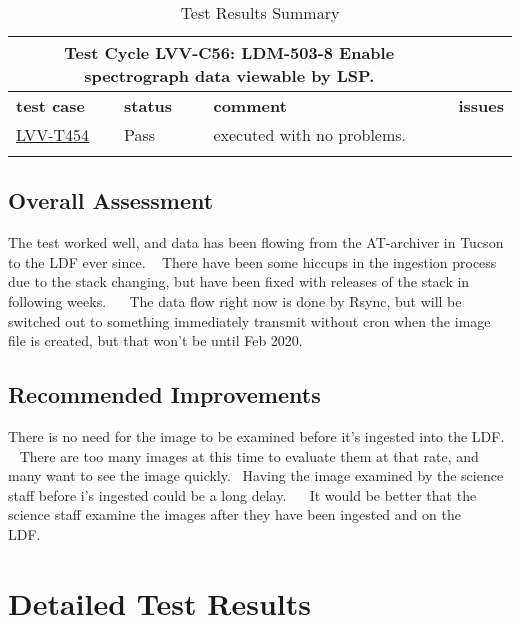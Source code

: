 \documentclass[DM,lsstdraft,STR,toc]{lsstdoc}
\begin{document}
\begin{longtable}{p{}p{}p{}p{}}
\toprule

  \multicolumn{3}{c}{ Test Cycle {\bf LVV-C56: LDM-503-8 Enable spectrograph data viewable by LSP.
 }} \\\hline

  {\bf \footnotesize test case} & {\bf \footnotesize status} & {\bf \footnotesize comment} & {\bf \footnotesize issues} \\\toprule

    \href{https://jira.lsstcorp.org/secure/Tests.jspa#/testCase/LVV-T454}{LVV-T454}
    & Pass & executed with no problems.~
 &
    \\\hline

\caption{Test Results Summary}
\label{table:summary}
\end{longtable}

\subsection{Overall Assessment}
\label{sect:overallassessment}

The test worked well, and data has been flowing from the AT-archiver in
Tucson to the LDF ever since. ~ There have been some hiccups in the
ingestion process due to the stack changing, but have been fixed with
releases of the stack in following weeks. ~ ~The data flow right now is
done by Rsync, but will be switched out to something immediately
transmit without cron when the image file is created, but that won't be
until Feb 2020.~~


\subsection{Recommended Improvements}
\label{sect:recommendations}

There is no need for the image to be examined before it's ingested into
the LDF. ~ There are too many images at this time to evaluate them at
that rate, and many want to see the image quickly. ~Having the image
examined by the science staff before i's ingested could be a long delay.
~ ~It would be better that the science staff examine the images after
they have been ingested and on the LDF.~~


\newpage
\section{Detailed Test Results}
\label{sect:detailedtestresults}
\end{document}
